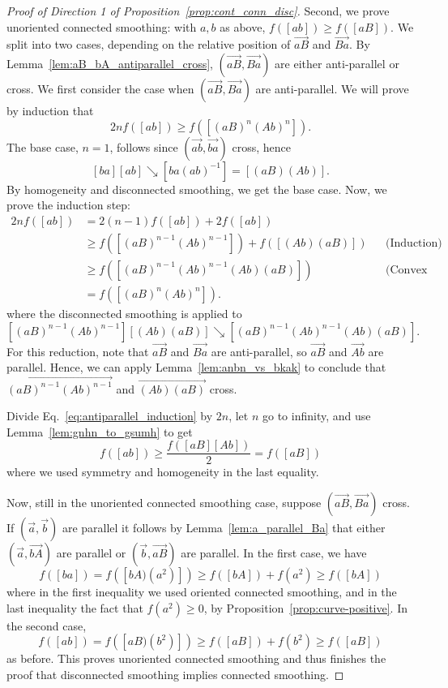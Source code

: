 \documentclass[11pt]{amsart}
\newcommand{\ora}[1]{\overrightarrow{#1}}
\numberwithin{equation}{section}
\numberwithin{figure}{section}
\theoremstyle{definition}
\theoremstyle{plain}
\newcommand{\reducesto}{\mathrel{\searrow}}
\begin{document}
\begin{proof}[Proof of Direction 1 of Proposition~\ref{prop:cont_conn_disc}]
			Second, we prove unoriented connected smoothing: with $a,b$ as above,
			$f([ab]) \ge f([aB])$.
			We split into two cases, depending on the relative position of $\ora{aB}$
			and $\ora{Ba}$. By
			Lemma~\ref{lem:aB_bA_antiparallel_cross}, $(\ora{aB},\ora{Ba})$ are either anti-parallel
			or cross.
				We first consider the case when $(\ora{aB},\ora{Ba})$ are anti-parallel. We will prove by induction that
				\begin{equation}
					2nf([ab]) \geq f([(aB)^n (Ab)^n]).
					\label{eq:antiparallel_induction}
				\end{equation}
				The base case, $n=1$, follows since $(\ora{ab},\ora{ba})$ cross, hence
				\[
				[ba][ab] \reducesto [ba(ab)^{-1}] = [(aB)(Ab)].
				\]
				By homogeneity and disconnected smoothing, we get the base case.
				Now, we prove the induction step:
\begin{align*}
2nf([ab])
&= 2(n-1)f([ab]) + 2f([ab]) \\
&\geq f([(aB)^{n-1} (Ab)^{n-1}]) + f([(Ab)(aB)]) && \text{(Induction)} \\
&\geq f([(aB)^{n-1} (Ab)^{n-1} (Ab)(aB)])
&& \text{(Convex union and disconnected smoothing)} \\
&= f([(aB)^n (Ab)^n]).
\end{align*}
				where the disconnected smoothing is applied to
				\[[(aB)^{n-1}(Ab)^{n-1}][(Ab)(aB)] \reducesto [(aB)^{n-1} (Ab)^{n-1}
				(Ab)(aB)].
				\]
				 For this reduction, note that $\ora{aB}$ and $\ora{Ba}$ are
				anti-parallel, so $\ora{aB}$ and $\ora{Ab}$ are parallel. Hence, we
				can apply Lemma~\ref{lem:anbn_vs_bkak} to conclude that
				$\ora{(aB)^{n-1} (Ab)^{n-1}}$ and $\ora{(Ab)(aB)}$ cross.
				
				Divide Eq.~\eqref{eq:antiparallel_induction} by $2n$, let $n$ go to
				infinity, and use Lemma~\ref{lem:gnhn_to_gsumh} to get
				\[
				f([ab]) \geq \frac{f([aB] [Ab])}{2} = f([aB])
				\]
				where we used symmetry and homogeneity in the last equality.
				
				Now, still in the unoriented connected smoothing case, suppose
				$(\ora{aB},\ora{Ba})$ cross.
				If $(\ora{a},\ora{b})$ are parallel it follows by Lemma~\ref{lem:a_parallel_Ba} that either $(\ora{a},\ora{bA})$ are parallel or $(\ora{b}, \ora{aB})$ are parallel.
				In the first case, we have 
				\[
				f([ba]) = f([bA)(a^2)]) \geq f([bA]) + f(a^2) \geq f([bA])
				\]
				where in the first inequality we used oriented connected smoothing, and in the last inequality the fact that $f(a^2) \geq 0$, by Proposition~\ref{prop:curve-positive}.
				In the second case,
				\[
				f([ab]) = f([aB)(b^2)]) \geq f([aB]) + f(b^2) \geq f([aB])
				\]
				as before. This proves unoriented connected smoothing and thus finishes the proof that disconnected smoothing implies connected smoothing.
\end{proof}	
		
\end{document}
